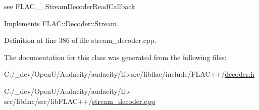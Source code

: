 see F\+L\+A\+C\+\_\+\+\_\+\+Stream\+Decoder\+Read\+Callback 



Implements \hyperlink{class_f_l_a_c_1_1_decoder_1_1_stream_af91735b6c715ca648493e837f513ef3d}{F\+L\+A\+C\+::\+Decoder\+::\+Stream}.



Definition at line 386 of file stream\+\_\+decoder.\+cpp.



The documentation for this class was generated from the following files\+:\begin{DoxyCompactItemize}
\item 
C\+:/\+\_\+dev/\+Open\+U/\+Audacity/audacity/lib-\/src/libflac/include/\+F\+L\+A\+C++/\hyperlink{libflac_2include_2_f_l_a_c_09_09_2decoder_8h}{decoder.\+h}\item 
C\+:/\+\_\+dev/\+Open\+U/\+Audacity/audacity/lib-\/src/libflac/src/lib\+F\+L\+A\+C++/\hyperlink{stream__decoder_8cpp}{stream\+\_\+decoder.\+cpp}\end{DoxyCompactItemize}

